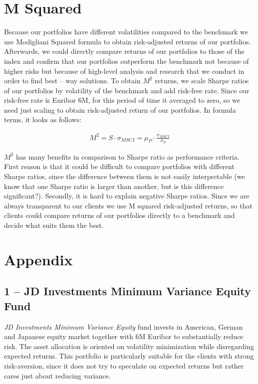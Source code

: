 \documentclass[11pt, parskip=full, DIV=14]{scrreprt}
\begin{document}
\chapter*{M Squared}
Because our portfolios have different volatilities compared to the benchmark we use Modigliani Squared formula to obtain risk-adjusted returns of our portfolios. Afterwards, we could directly compare returns of our portfolios to those of the index and confirm that our portfolios outperform the benchmark not because of higher risks but because of high-level analysis and research that we conduct in order to find best – way solutions. To obtain $M^2$ returns, we scale Sharpe ratios of our portfolios by volatility of the benchmark and add risk-free rate. Since our risk-free rate is Euribor 6M, for this period of time it averaged to zero, so we need just scaling to obtain risk-adjusted return of our portfolios. In formula terms, it looks as follows:

\begin{align*}
  M^2 = S \cdot \sigma_{MSCI} = \mu_P \cdot \frac{\sigma_{MSCI}}{\sigma_P}
\end{align*}

$M^2$ has many benefits in comparison to Sharpe ratio as performance criteria.  First reason is that it could be difficult to compare portfolios with different Sharpe ratios, since the difference between them is not easily interpretable (we know that one Sharpe ratio is larger than another, but is this difference significant?). Secondly, it is hard to explain negative Sharpe ratios. Since we are always transparent to our clients we use M squared risk-adjusted returns, so that clients could compare returns of our portfolios directly to a benchmark and decide what suits them the best.


\newpage
\chapter{Appendix}
\section*{1 -- JD Investments Minimum Variance Equity Fund}
\textit{JD Investments Minimum Variance Equity} fund invests in American, German and Japanese equity market together with 6M Euribor to substantially reduce risk.
The asset allocation is oriented on volatility minimization while disregarding expected returns.
This portfolio is particularly suitable for the clients with strong risk-aversion, since it does not try to speculate on expected returns but rather cares just about reducing variance.
\end{document}
